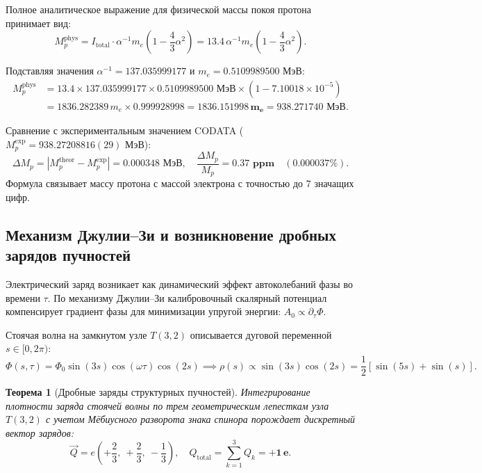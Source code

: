 \documentclass[11pt,a4paper]{article}
\newtheorem{theorem}{Теорема}[section]
\theoremstyle{definition}
\theoremstyle{remark}
\begin{document}
Полное аналитическое выражение для физической массы покоя протона принимает вид:
\begin{equation}
    M_p^{\mathrm{phys}} = I_{\mathrm{total}} \cdot \alpha^{-1} m_e \left( 1 - \frac{4}{3}\alpha^2 \right) = 13.4 \, \alpha^{-1} m_e \left( 1 - \frac{4}{3}\alpha^2 \right).
    \label{eq:proton_mass_exact}
\end{equation}

Подставляя значения $\alpha^{-1} = 137.035999177$ и $m_e = 0.5109989500$ МэВ:
\begin{align}
    M_p^{\mathrm{phys}} &= 13.4 \times 137.035999177 \times 0.5109989500\text{ МэВ} \times \left( 1 - 7.10018 \times 10^{-5} \right) \nonumber \\
    &= 1836.282389 \, m_e \times 0.999928998 = \mathbf{1836.151998 \, m_e} = \mathbf{938.271740\text{ МэВ}}.
\end{align}

Сравнение с экспериментальным значением CODATA ($M_p^{\mathrm{exp}} = 938.27208816(29)$ МэВ):
\begin{equation}
    \Delta M_p = |M_p^{\mathrm{theor}} - M_p^{\mathrm{exp}}| = 0.000348\text{ МэВ}, \quad \frac{\Delta M_p}{M_p} = \mathbf{0.37\text{ ppm}} \quad (0.000037\%).
\end{equation}
Формула связывает массу протона с массой электрона с точностью до 7 значащих цифр.

\subsection{Механизм Джулии--Зи и возникновение дробных зарядов пучностей}
Электрический заряд возникает как динамический эффект автоколебаний фазы во времени $\tau$. По механизму Джулии--Зи калибровочный скалярный потенциал компенсирует градиент фазы для минимизации упругой энергии: $A_0 \propto \partial_\tau \Phi$.

Стоячая волна на замкнутом узле $T(3,2)$ описывается дуговой переменной $s \in [0, 2\pi)$:
\begin{equation}
    \Phi(s, \tau) = \Phi_0 \sin(3s) \cos(\omega \tau) \cos(2s) \implies \rho(s) \propto \sin(3s)\cos(2s) = \frac{1}{2}\left[ \sin(5s) + \sin(s) \right].
\end{equation}

\begin{theorem}[Дробные заряды структурных пучностей]
Интегрирование плотности заряда стоячей волны по трем геометрическим лепесткам узла $T(3,2)$ с учетом Мёбиусного разворота знака спинора порождает дискретный вектор зарядов:
\begin{equation}
    \vec{Q} = e \left( +\frac{2}{3}, \ +\frac{2}{3}, \ -\frac{1}{3} \right), \quad Q_{\mathrm{total}} = \sum_{k=1}^3 Q_k = \mathbf{+1 \, e}.
    \label{eq:quark_charges}
\end{equation}
\end{theorem}
\end{document}
